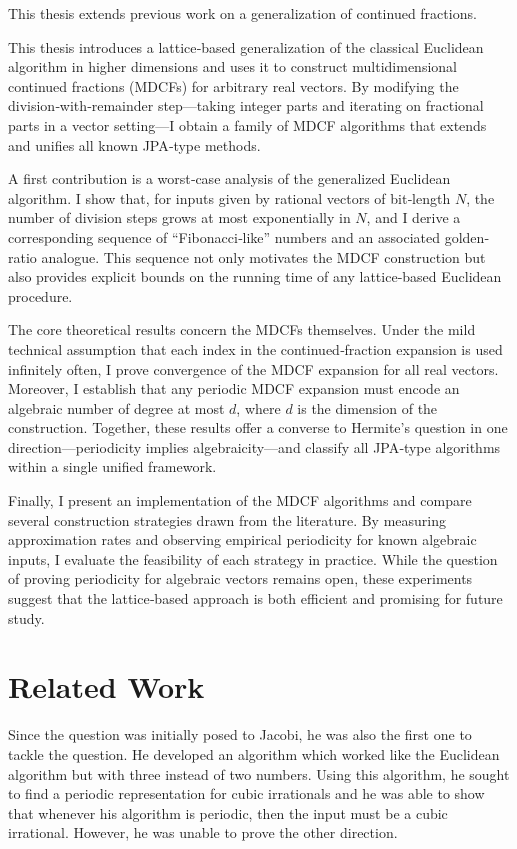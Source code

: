This thesis extends previous work on a generalization of continued fractions.

This thesis introduces a lattice‐based generalization of the classical Euclidean
algorithm in higher dimensions and uses it to construct multidimensional continued
fractions (MDCFs) for arbitrary real vectors.  By modifying the division‐with‐remainder
step—taking integer parts and iterating on fractional parts in a vector setting—I
obtain a family of MDCF algorithms that extends and unifies all known JPA‐type methods.

A first contribution is a worst‐case analysis of the generalized Euclidean algorithm.
I show that, for inputs given by rational vectors of bit‐length $N$, the number of
division steps grows at most exponentially in $N$, and I derive a corresponding
sequence of “Fibonacci‐like” numbers and an associated golden‐ratio analogue.  This
sequence not only motivates the MDCF construction but also provides explicit bounds
on the running time of any lattice‐based Euclidean procedure.

The core theoretical results concern the MDCFs themselves.  Under the mild technical
assumption that each index in the continued‐fraction expansion is used infinitely
often, I prove convergence of the MDCF expansion for all real vectors.  Moreover,
I establish that any periodic MDCF expansion must encode an algebraic number of
degree at most $d$, where $d$ is the dimension of the construction.  Together,
these results offer a converse to Hermite’s question in one direction—periodicity
implies algebraicity—and classify all JPA‐type algorithms within a single unified
framework.

Finally, I present an implementation of the MDCF algorithms and compare several
construction strategies drawn from the literature.  By measuring approximation
rates and observing empirical periodicity for known algebraic inputs, I evaluate
the feasibility of each strategy in practice.  While the question of proving
periodicity for algebraic vectors remains open, these experiments suggest that
the lattice‐based approach is both efficient and promising for future study.

\section{Related Work}

Since the question was initially posed to Jacobi, he was also the first one to tackle the question.
He developed an algorithm which worked like the Euclidean algorithm but with three instead of two numbers.
Using this algorithm, he sought to find a periodic representation for cubic irrationals
and he was able to show that whenever his algorithm is periodic, then the input must be a cubic irrational.
However, he was unable to prove the other direction.

